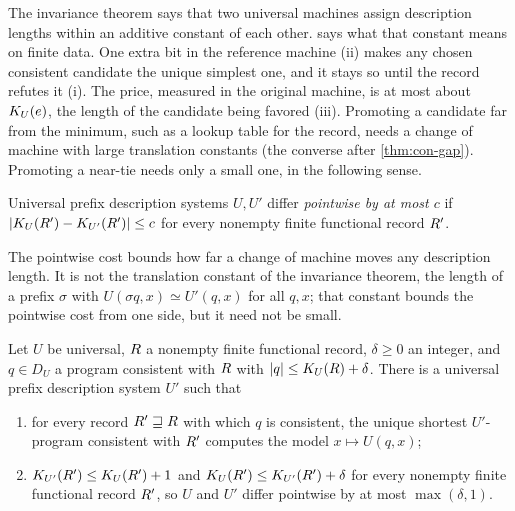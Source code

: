 The invariance theorem \citetext{\citealp[\S3]{kolmogorov1965}; \citealp{li-vitanyi2019}} says that two universal
machines assign description lengths within an additive constant of each other.
 says what that constant means on finite data. One extra bit in
the reference machine (ii) makes any chosen consistent candidate the unique simplest
one, and it stays so until the record refutes it (i). The price, measured in the
original machine, is at most about $K_{U}(e)$, the length of the candidate being favored
(iii). Promoting a candidate far from the minimum, such as a lookup table for the
record, needs a change of machine with large translation constants (the converse
after \cref{thm:con-gap}). Promoting a near-tie needs only a
small one, in the following sense.

\begin{definition}\label{con:def:pointwise}
Universal prefix description systems $U,U'$ differ \emph{pointwise by at most $c$} if
$|K_{U}(R')-K_{U'}(R')|\le c$ for every nonempty finite functional record
$R'$.
\end{definition}

The pointwise cost bounds how far a change of machine moves any description length.
It is not the translation constant of the invariance theorem, the length of a prefix
$\sigma$ with $U(\sigma q,x)\simeq U'(q,x)$ for all $q,x$; that constant bounds the
pointwise cost from one side, but it need not be small.

\begin{theorem}\label{thm:con-gap}
Let $U$ be universal, $R$ a nonempty finite functional record, $\delta\ge0$ an
integer, and $q\in D_U$ a program consistent with $R$ with
$|q|\le K_{U}(R)+\delta$. There is a universal prefix description system $U'$ such
that
\begin{enumerate}[label=(\roman*)]
  \item for every record $R'\sqsupseteq R$ with which $q$ is consistent, the
        unique shortest $U'$-program consistent with $R'$ computes the model
        $x\mapsto U(q,x)$;
  \item $K_{U'}(R')\le K_{U}(R')+1$ and $K_{U}(R')\le K_{U'}(R')+\delta$
        for every nonempty finite functional record $R'$, so $U$ and $U'$ differ
        pointwise by at most $\max(\delta,1)$.
\end{enumerate}
\end{theorem}


